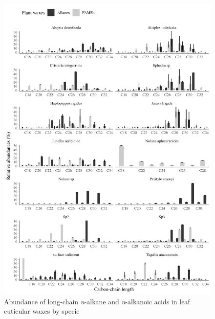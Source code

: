 \documentclass[
  authoryear,
  preprint,
  3p]{elsarticle}
\begin{document}
\begin{figure}

{\centering \includegraphics{images/Fig_1S.png}

}

\caption{Abundance of long-chain \emph{n}-alkane and \emph{n}-alkanoic
acids in leaf cuticular waxes by specie}

\end{figure}
\end{document}
